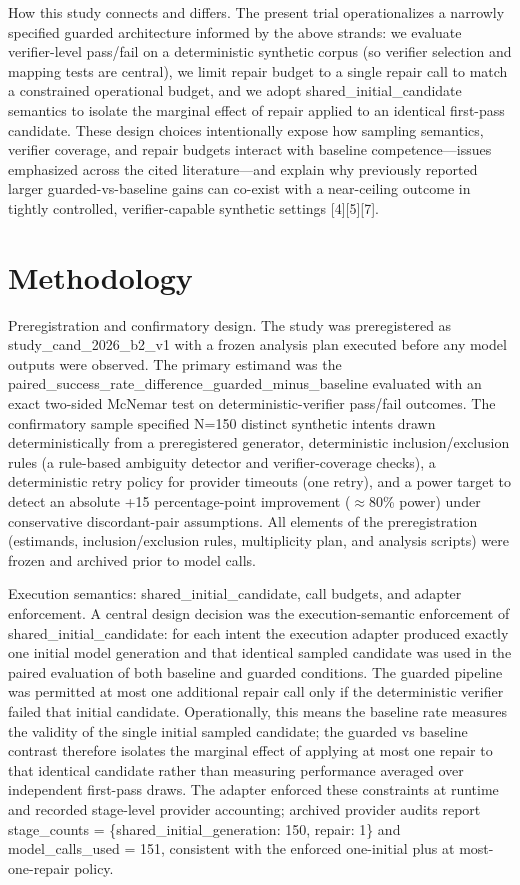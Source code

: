 \documentclass[conference]{IEEEtran}
\begin{document}
How this study connects and differs. The present trial operationalizes a narrowly specified guarded architecture informed by the above strands: we evaluate verifier-level pass/fail on a deterministic synthetic corpus (so verifier selection and mapping tests are central), we limit repair budget to a single repair call to match a constrained operational budget, and we adopt shared\_initial\_candidate semantics to isolate the marginal effect of repair applied to an identical first-pass candidate. These design choices intentionally expose how sampling semantics, verifier coverage, and repair budgets interact with baseline competence---issues emphasized across the cited literature---and explain why previously reported larger guarded-vs-baseline gains can co-exist with a near-ceiling outcome in tightly controlled, verifier-capable synthetic settings [4][5][7].

\section{Methodology}
Preregistration and confirmatory design. The study was preregistered as study\_cand\_2026\_b2\_v1 with a frozen analysis plan executed before any model outputs were observed. The primary estimand was the paired\_success\_rate\_difference\_guarded\_minus\_baseline evaluated with an exact two-sided McNemar test on deterministic-verifier pass/fail outcomes. The confirmatory sample specified N=150 distinct synthetic intents drawn deterministically from a preregistered generator, deterministic inclusion/exclusion rules (a rule-based ambiguity detector and verifier-coverage checks), a deterministic retry policy for provider timeouts (one retry), and a power target to detect an absolute +15 percentage-point improvement (\ensuremath{\approx}80\% power) under conservative discordant-pair assumptions. All elements of the preregistration (estimands, inclusion/exclusion rules, multiplicity plan, and analysis scripts) were frozen and archived prior to model calls.

Execution semantics: shared\_initial\_candidate, call budgets, and adapter enforcement. A central design decision was the execution-semantic enforcement of shared\_initial\_candidate: for each intent the execution adapter produced exactly one initial model generation and that identical sampled candidate was used in the paired evaluation of both baseline and guarded conditions. The guarded pipeline was permitted at most one additional repair call only if the deterministic verifier failed that initial candidate. Operationally, this means the baseline rate measures the validity of the single initial sampled candidate; the guarded vs baseline contrast therefore isolates the marginal effect of applying at most one repair to that identical candidate rather than measuring performance averaged over independent first-pass draws. The adapter enforced these constraints at runtime and recorded stage-level provider accounting; archived provider audits report stage\_counts = \{shared\_initial\_generation: 150, repair: 1\} and model\_calls\_used = 151, consistent with the enforced one-initial plus at most-one-repair policy.
\end{document}
